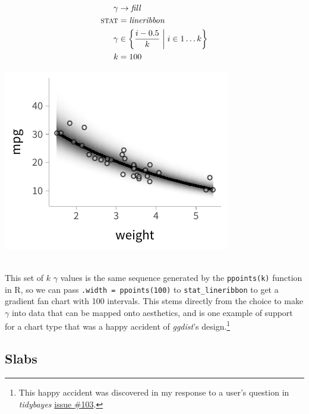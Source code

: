 \documentclass[journal]{vgtc}                     %
\newcommand{\equationfigure}[2]{%
\noindent
\begin{minipage}{.5\columnwidth}
\setlength{\abovedisplayskip}{0pt}
\setlength{\belowdisplayskip}{0pt}
#1\end{minipage}%
\begin{minipage}{.4\columnwidth}\centering #2 \end{minipage}%
\vspace{.5\belowdisplayskip}\\
}
\begin{document}
\equationfigure{
\begin{align*}
\gamma &\rightarrow \mathit{fill}\\
\textsc{stat} &= \mathit{lineribbon}\\
\gamma &\in \left\{\frac{i - 0.5}{k} \mathrel{}\middle|\mathrel{} i \in 1 \dots k \right\}\\
k &= 100
\end{align*}
}{\includegraphics[width=1.2\columnwidth]{figs/3-lineribbon_fan.pdf}}
This set of $k$  $\gamma$ values is the same sequence generated by the \texttt{ppoints(k)} function in R, so we can pass \texttt{.width = ppoints(100)} to \texttt{stat\_lineribbon} to get a gradient fan chart with 100 intervals. This stems directly from the choice to make $\gamma$ into data that can be mapped onto aesthetics, and is one example of support for a chart type that was a happy accident of \textit{ggdist}'s design.\footnote{This happy accident was discovered in my response to a user's question in \textit{tidybayes} \href{https://github.com/mjskay/tidybayes/issues/103}{issue \#103}.}

\subsection{Slabs}
\end{document}
